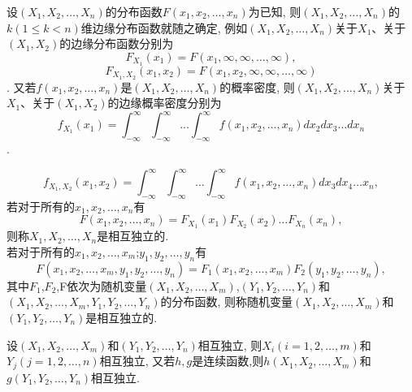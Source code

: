 \begin{definition*}

    设$(X_1,X_2,\dots,X_n)$的分布函数$F(x_1,x_2,\dots,x_n)$为已知, 则$(X_1,X_2,\dots,X_n)$的$k(1 \leq k < n )$维边缘分布函数就随之确定, 例如$(X_1,X_2,\dots,X_n)$关于$X_1$、关于$(X_1,X_2)$的边缘分布函数分别为
    \[F_{X_1}(x_1) = F(x_1,\infty,\infty,\dots,\infty),\]
    \[F_{X_1,X_2}(x_1,x_2) = F(x_1,x_2,\infty,\infty,\dots,\infty)\].
又若$f(x_1,x_2,\dots,x_n)$是$(X_1,X_2,\dots,X_n)$的概率密度, 则$(X_1,X_2,\dots,X_n)$关于$X_1$、关于$(X_1,X_2)$的边缘概率密度分别为
    \[f_{X_1}(x_1) = \int_{-\infty}^{\infty}\int_{-\infty}^{\infty}
    \dots \int_{-\infty}^{\infty}f(x_1,x_2,\dots,x_n)d{x_2}d{x_3}\dots d{x_n}\].

    \[f_{X_1,X_2}\left(x_1,x_2\right) = \int_{-\infty}^{\infty} \int_{-\infty}^{\infty} \dots \int_{-\infty}^{\infty}f\left(x_1,x_2,\dots,x_n\right)d{x_3}d{x_4} \dots {x_n},\]
    \quad 若对于所有的$x_1,x_2,\dots,x_n$有
    \[F\left(x_1,x_2,\dots,x_n\right) = F_{X_1}\left(x_1\right)F_{X_2}\left(x_2\right)\dots F_{X_n}\left(x_n\right),\]
    则称$X_1,X_2,\dots,X_n$是相互独立的.\\
    若对于所有的$x_1,x_2,\dots,x_m$;$y_1,y_2,\dots,y_n$有
    \[F\left(x_1,x_2,\dots,x_m,y_1,y_2,\dots,y_n\right) = F_1\left(x_1,x_2,\dots,x_m\right)F_2\left(y_1,y_2,\dots,y_n\right),\]
    其中$F_1$,$F_2$,F依次为随机变量$\left(X_1,X_2,\dots,X_m\right)$,$\left(Y_1,Y_2,\dots,Y_n\right)$和$\left(X_1,X_2,\dots,X_m,Y_1,Y_2,\dots,Y_n\right)$的分布函数, 则称随机变量$\left(X_1,X_2,\dots,X_m\right)$和$\left(Y_1,Y_2,\dots,Y_n\right)$是相互独立的.
\end{definition*}


\begin{theorem}
    设$\left(X_1,X_2,\dots,X_m\right)$和$\left(Y_1,Y_2,\dots,Y_n\right)$相互独立, 则$X_i\left(i = 1,2,\dots,m\right)$和$Y_j\left(j = 1,2,\dots,n\right)$相互独立, 又若$h,g$是连续函数,则$h\left(X_1,X_2,\dots,X_m\right)$和$g\left(Y_1,Y_2,\dots,Y_n\right)$相互独立.
\end{theorem}
